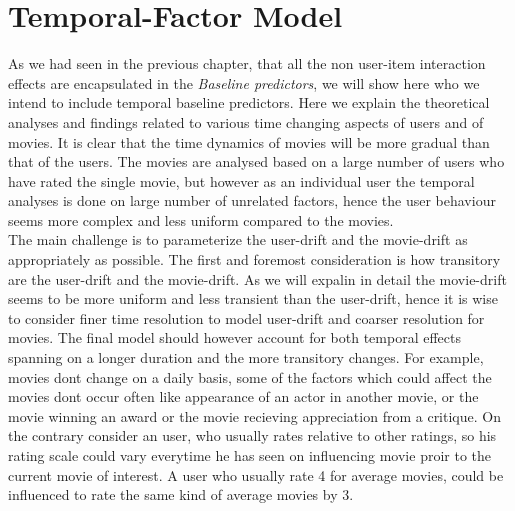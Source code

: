 \section{Temporal-Factor Model}
As we had seen in the previous chapter, that all the non user-item interaction
effects are encapsulated in the \emph{Baseline predictors}, we will show here
who we intend to include temporal baseline predictors. Here we explain the
theoretical analyses and findings related to various time changing aspects of
users and of movies. It is clear that the time dynamics of movies will be more
gradual than that of the users. The movies are analysed based on a large number
of users who have rated the single movie, but however as an individual user the
temporal analyses is done on large number of unrelated factors, hence the user
behaviour seems more complex and less uniform compared to the movies. \\
The main challenge is to parameterize the user-drift and the movie-drift as
appropriately as possible. The first and foremost consideration is how
transitory are the user-drift and the movie-drift. As we will expalin in detail
the movie-drift seems to be more uniform and less transient than the user-drift,
hence it is wise to consider finer time resolution to model user-drift and
coarser resolution for movies. The final model should however account for both
temporal effects spanning on a longer duration and the more transitory changes. 
For example, movies dont change on a daily basis, some of the factors which
could affect the movies dont occur often like appearance of an actor in another
movie, or the movie winning an award or the movie recieving appreciation from a
critique. On the contrary consider an user, who usually rates relative to other
ratings, so his rating scale could vary everytime he has seen on influencing
movie proir to the current movie of interest. A user who usually rate 4 for
average movies, could be influenced to rate the same kind of average movies by
3. \\

